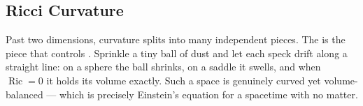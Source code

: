 \documentclass[12pt]{article}
\begin{document}
\begin{postercolumns}
\begin{postercolumn}
\section{Ricci Curvature}
Past two dimensions, curvature splits into many independent pieces.
The  is the piece that controls .
Sprinkle a tiny ball of dust and let each speck drift along a straight
line: on a sphere the ball shrinks, on a saddle it swells, and when
$\operatorname{Ric} = 0$ it holds its volume exactly. Such a space is
genuinely curved yet volume-balanced --- which is precisely Einstein's
equation for a spacetime with no matter. 
\end{postercolumn}
\begin{postercolumn}[wide]

\end{postercolumn}
\end{postercolumns}
\end{document}

